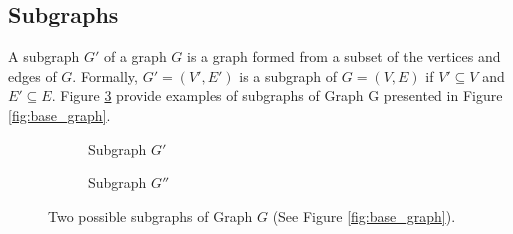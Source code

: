         \subsection{Subgraphs}
        
            A subgraph \( G' \) of a graph \( G \) is a graph formed from a subset of the vertices and edges of \( G \)\cite{cormen, bondy1976graph}. Formally, \( G' = (V', E') \) is a subgraph of \( G = (V, E) \) if \( V' \subseteq V \) and \( E' \subseteq E \). Figure \ref{fig:subgraphs} provide examples of subgraphs of Graph G presented in Figure \ref{fig:base_graph}.

            \begin{figure}[!ht]
                \centering
                \begin{subfigure}{0.45\textwidth}
                    \centering
                    \caption{Subgraph $G'$} 
                    \label{fig:subgraph_1}
                \end{subfigure}
                \hfill
                \begin{subfigure}{0.45\textwidth}
                    \centering
                    \caption{Subgraph $G''$} 
                    \label{fig:subgraph_2}
                \end{subfigure}
                \caption{Two possible subgraphs of Graph $G$ (See Figure \ref{fig:base_graph}).}
                \label{fig:subgraphs}
            \end{figure}
        
